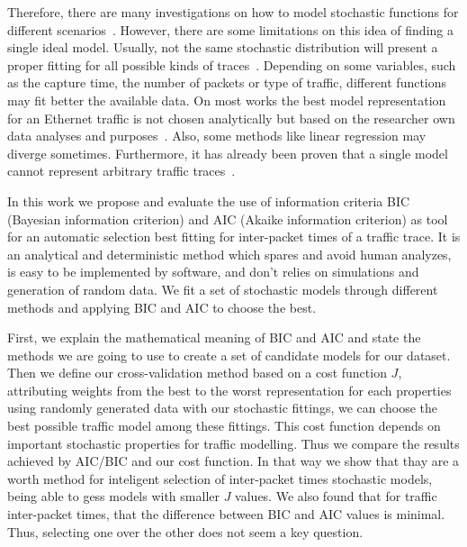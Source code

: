 Therefore, there are many investigations on how to model stochastic functions for different scenarios~\cite{estimation-renewal-function-ethernet-traffic}\cite{modelling-of-self-similar}\cite{empirical-interarrival-study}\cite{modeling-concurrent-heavy-tailed}\cite{optimal-scheduling-of-heavy-tailed-traffic}\cite{modelling-of-self-similar}. However, there are some limitations on this idea of finding a single ideal model. Usually, not the same stochastic distribution will present a proper fitting for all possible kinds of traces~\cite{sourcesonoff-paper}. Depending on some variables, such as the capture time, the number of packets or type of traffic, different functions may fit better the available data. On most works the best model representation for an Ethernet traffic is not chosen analytically but based on the researcher own data analyses and purposes~\cite{hierarchical-dynamics-interarrival-times}\cite{modeling-concurrent-heavy-tailed}\cite{optimal-scheduling-of-heavy-tailed-traffic}. Also, some methods like linear regression may diverge sometimes. Furthermore, it has already been proven that a single model cannot represent arbitrary traffic traces~\cite{sourcesonoff-paper}.  



In this work we propose and evaluate the use of information criteria BIC (Bayesian information criterion) and AIC (Akaike information criterion) as tool for an automatic selection best fitting for inter-packet times of a traffic trace. It is an analytical and deterministic method which spares and avoid human analyzes, is easy to be implemented by software, and don't relies on simulations and generation of random data. We fit a set of stochastic models through different methods and applying BIC and AIC to choose the best.  



First, we explain the mathematical meaning of BIC and AIC and state the methods we are going to use to create a set of candidate models for our dataset. Then we define our cross-validation method based on a cost function $J$, attributing weights from the best to the worst representation for each properties using randomly generated data with our stochastic fittings, we can choose the best possible traffic model among these fittings. This cost function depends on important stochastic properties for traffic modelling. Thus we compare the results achieved by AIC/BIC and our cost function. In that way we show that thay are a worth method for inteligent selection of inter-packet times stochastic models, being able to gess models with smaller $J$ values. We also found that for traffic inter-packet times, that the difference between BIC and AIC values is minimal. Thus, selecting  one over the other does not seem a key question. 


